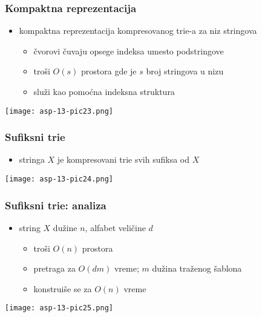 \documentclass[compress,aspectratio=169]{beamer}
\begin{document}
\begin{frame}[fragile]
  \frametitle{Kompaktna reprezentacija}
  \begin{itemize}
    \item kompaktna reprezentacija kompresovanog trie-a za niz stringova
    \begin{itemize}
      \item čvorovi čuvaju opsege indeksa umesto podstringove
      \item troši $O(s)$ prostora gde je $s$ broj stringova u nizu
      \item služi kao pomoćna indeksna struktura
    \end{itemize}
  \end{itemize}
  \begin{center}
    \texttt{[image: asp-13-pic23.png]}
  \end{center}
\end{frame}

\begin{frame}[fragile]
  \frametitle{Sufiksni trie}
  \begin{itemize}
    \item {} stringa $X$ je kompresovani trie svih sufiksa od $X$
  \end{itemize}
  \begin{center}
    \texttt{[image: asp-13-pic24.png]}
  \end{center}
\end{frame}

\begin{frame}[fragile]
  \frametitle{Sufiksni trie: analiza}
  \begin{itemize}
    \item string $X$ dužine $n$, alfabet veličine $d$
    \begin{itemize}
      \item troši $O(n)$ prostora
      \item pretraga za $O(dm)$ vreme; $m$ dužina traženog šablona
      \item konstruiše se za $O(n)$ vreme
    \end{itemize}
  \end{itemize}
  \begin{center}
    \texttt{[image: asp-13-pic25.png]}
  \end{center}
\end{frame}
\end{document}
